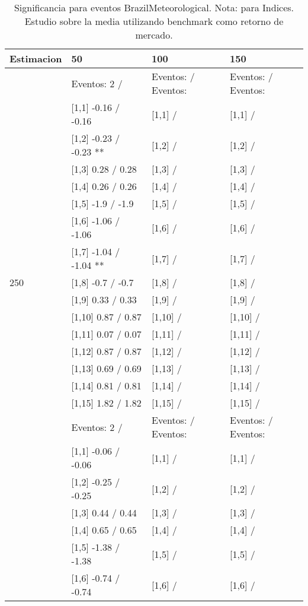\begin{table}

\caption{Significancia para eventos BrazilMeteorological. Nota: para Indices. Estudio sobre la media utilizando benchmark como retorno de mercado.}
\centering
\begin{tabular}[t]{llll}
\toprule
Estimacion & 50 & 100 & 150\\
\midrule
 & Eventos:  2 / & Eventos:   / Eventos: & Eventos:   / Eventos:\\
 & {}[1,1] -0.16  / -0.16 & {}[1,1]  / & {}[1,1]  /\\
 & {}[1,2] -0.23  / -0.23 ** & {}[1,2]  / & {}[1,2]  /\\
 & {}[1,3] 0.28  / 0.28 & {}[1,3]  / & {}[1,3]  /\\
 & {}[1,4] 0.26  / 0.26 & {}[1,4]  / & {}[1,4]  /\\
\addlinespace
 & {}[1,5] -1.9  / -1.9 & {}[1,5]  / & {}[1,5]  /\\
 & {}[1,6] -1.06  / -1.06 & {}[1,6]  / & {}[1,6]  /\\
 & {}[1,7] -1.04  / -1.04 ** & {}[1,7]  / & {}[1,7]  /\\
250 & {}[1,8] -0.7  / -0.7 & {}[1,8]  / & {}[1,8]  /\\
 & {}[1,9] 0.33  / 0.33 & {}[1,9]  / & {}[1,9]  /\\
\addlinespace
 & {}[1,10] 0.87  / 0.87 & {}[1,10]  / & {}[1,10]  /\\
 & {}[1,11] 0.07  / 0.07 & {}[1,11]  / & {}[1,11]  /\\
 & {}[1,12] 0.87  / 0.87 & {}[1,12]  / & {}[1,12]  /\\
 & {}[1,13] 0.69  / 0.69 & {}[1,13]  / & {}[1,13]  /\\
 & {}[1,14] 0.81  / 0.81 & {}[1,14]  / & {}[1,14]  /\\
\addlinespace
 & {}[1,15] 1.82  / 1.82 & {}[1,15]  / & {}[1,15]  /\\
 & Eventos:  2 / & Eventos:   / Eventos: & Eventos:   / Eventos:\\
 & {}[1,1] -0.06  / -0.06 & {}[1,1]  / & {}[1,1]  /\\
 & {}[1,2] -0.25  / -0.25 & {}[1,2]  / & {}[1,2]  /\\
 & {}[1,3] 0.44  / 0.44 & {}[1,3]  / & {}[1,3]  /\\
\addlinespace
 & {}[1,4] 0.65  / 0.65 & {}[1,4]  / & {}[1,4]  /\\
 & {}[1,5] -1.38  / -1.38 & {}[1,5]  / & {}[1,5]  /\\
 & {}[1,6] -0.74  / -0.74 & {}[1,6]  / & {}[1,6]  /\\

\end{tabular}
\end{table}
